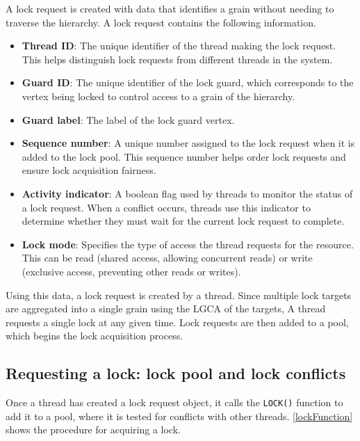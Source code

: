A lock request is created with data that identifies a grain without needing to traverse the hierarchy. A lock request contains the following information.

\begin{itemize}
	\item \textbf{Thread ID}: The unique identifier of the thread making the lock request. This helps distinguish lock requests from different threads in the system.
	\item \textbf{Guard ID}: The unique identifier of the lock guard, which corresponds to the vertex being locked to control access to a grain of the hierarchy.
	\item \textbf{Guard label}: The label of the lock guard vertex.
	\item \textbf{Sequence number}: A unique number assigned to the lock request when it is added to the lock pool. This sequence number helps order lock requests and ensure lock acquisition fairness.
	\item \textbf{Activity indicator}: A boolean flag used by threads to monitor the status of a lock request. When a conflict occurs, threads use this indicator to determine whether they must wait for the current lock request to complete.
	\item \textbf{Lock mode}: Specifies the type of access the thread requests for the resource. This can be read (shared access, allowing concurrent reads) or write (exclusive access, preventing other reads or writes).
\end{itemize}

Using this data, a lock request is created by a thread. Since multiple lock targets are aggregated into a single grain using the LGCA of the targets, A thread requests a single lock at any given time. Lock requests are then added to a pool, which begins the lock acquisition process. 



\subsection{Requesting a lock: lock pool and lock conflicts}
Once a thread has created a lock request object, it calls the \lstinline|LOCK()| function to add it to a pool, where it is tested for conflicts with other threads. \cref{lockFunction} shows the procedure for acquiring a lock.

